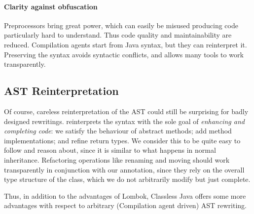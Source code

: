 \paragraph{Clarity against obfuscation}
Preprocessors bring great power, which can easily be misused producing
code particularly hard to understand. Thus code quality and maintainability are reduced.
Compilation agents start from Java syntax, but they can reinterpret it.
Preserving the syntax avoids syntactic conflicts, and allows many
tools to work transparently.

\subsection{\mixin AST Reinterpretation}

Of course, careless reinterpretation of the AST could still be
surprising for badly designed rewritings.  \mixin reinterprets
the syntax with the sole goal of \emph{enhancing and completing code}:
we satisfy the behaviour of abstract methods; add method
implementations; and refine return types.  We consider this to be
quite easy to follow and reason about, since it is similar to what
happens in normal inheritance.  Refactoring operations like renaming
and moving should work transparently in conjunction with our
annotation, since they rely on the overall type structure of the
class, which we do not arbitrarily modify but just complete.

Thus, in addition to the advantages of Lombok, Classless Java offers
some more advantages with respect to arbitrary (Compilation agent driven) AST rewriting.



